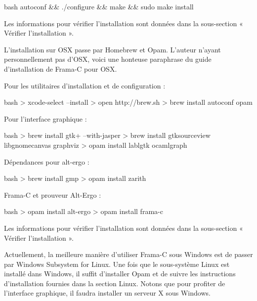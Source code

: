 \begin{CodeBlock}{bash}
autoconf && ./configure && make && sudo make install
\end{CodeBlock}


Les informations pour vérifier l'installation sont données dans la sous-section « Vérifier l'installation ».




L'installation sur OSX passe par Homebrew et Opam. L'auteur n'ayant
personnellement pas d'OSX, voici une honteuse paraphrase du guide
d'installation de Frama-C pour OSX.



Pour les utilitaires d'installation et de configuration :



\begin{CodeBlock}{bash}
> xcode-select --install
> open http://brew.sh
> brew install autoconf opam
\end{CodeBlock}



Pour l'interface graphique :



\begin{CodeBlock}{bash}
> brew install gtk+ --with-jasper
> brew install gtksourceview libgnomecanvas graphviz
> opam install lablgtk ocamlgraph
\end{CodeBlock}



Dépendances pour alt-ergo :



\begin{CodeBlock}{bash}
> brew install gmp
> opam install zarith
\end{CodeBlock}



Frama-C et prouveur Alt-Ergo :



\begin{CodeBlock}{bash}
> opam install alt-ergo
> opam install frama-c
\end{CodeBlock}


Les informations pour vérifier l'installation sont données dans la sous-section « Vérifier l'installation ».





Actuellement, la meilleure manière d'utiliser Frama-C sous Windows
est de passer par Windows Subsystem for Linux. Une fois que le sous-système
Linux est installé dans Windows, il suffit d'installer Opam et de suivre les
instructions d'installation fournies dans la section Linux. Notons que pour
profiter de l'interface graphique, il faudra installer un serveur X sous
Windows.


